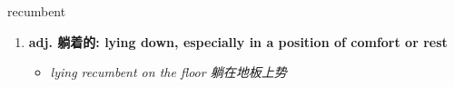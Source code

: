 
\begin{frame}
{\huge recumbent}
\begin{center}
\begin{enumerate}\Large
  \item \textbf{adj. 躺着的: lying down, especially in a position of comfort or rest}
  \begin{itemize}
    \item \em{\Large{lying recumbent on the floor 躺在地板上势}}
  \end{itemize}
\end{enumerate}
\end{center}
\end{frame}
